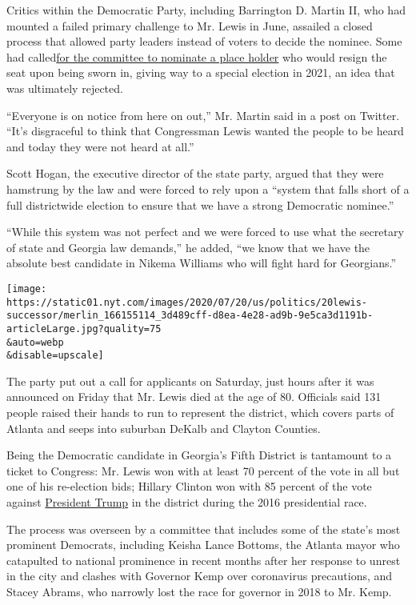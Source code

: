 Critics within the Democratic Party, including Barrington D. Martin II,
who had mounted a failed primary challenge to Mr. Lewis in June,
assailed a closed process that allowed party leaders instead of voters
to decide the nominee. Some had
called\href{https://www.ajc.com/politics/politics-blog/georgia-democrats-to-decide-today-who-will-replace-john-lewis-on-the-ballot/EZ33XDYU2FA43IGL2NBOE4EI3Q/}{for
the committee to nominate a place holder} who would resign the seat upon
being sworn in, giving way to a special election in 2021, an idea that
was ultimately rejected.

``Everyone is on notice from here on out,'' Mr. Martin said in a post on
Twitter. ``It's disgraceful to think that Congressman Lewis wanted the
people to be heard and today they were not heard at all.''

Scott Hogan, the executive director of the state party, argued that they
were hamstrung by the law and were forced to rely upon a ``system that
falls short of a full districtwide election to ensure that we have a
strong Democratic nominee.''

``While this system was not perfect and we were forced to use what the
secretary of state and Georgia law demands,'' he added, ``we know that
we have the absolute best candidate in Nikema Williams who will fight
hard for Georgians.''

\texttt{[image: https://static01.nyt.com/images/2020/07/20/us/politics/20lewis-successor/merlin\_166155114\_3d489cff-d8ea-4e28-ad9b-9e5ca3d1191b-articleLarge.jpg?quality=75\\\&auto=webp\\\&disable=upscale]}

The party put out a call for applicants on Saturday, just hours after it
was announced on Friday that Mr. Lewis died at the age of 80. Officials
said 131 people raised their hands to run to represent the district,
which covers parts of Atlanta and seeps into suburban DeKalb and Clayton
Counties.

Being the Democratic candidate in Georgia's Fifth District is tantamount
to a ticket to Congress: Mr. Lewis won with at least 70 percent of the
vote in all but one of his re-election bids; Hillary Clinton won with 85
percent of the vote against
\href{https://www.nytimes.com/interactive/2020/us/elections/donald-trump.html}{President
Trump} in the district during the 2016 presidential race.

The process was overseen by a committee that includes some of the
state's most prominent Democrats, including Keisha Lance Bottoms, the
Atlanta mayor who catapulted to national prominence in recent months
after her response to unrest in the city and clashes with Governor Kemp
over coronavirus precautions, and Stacey Abrams, who narrowly lost the
race for governor in 2018 to Mr. Kemp.

